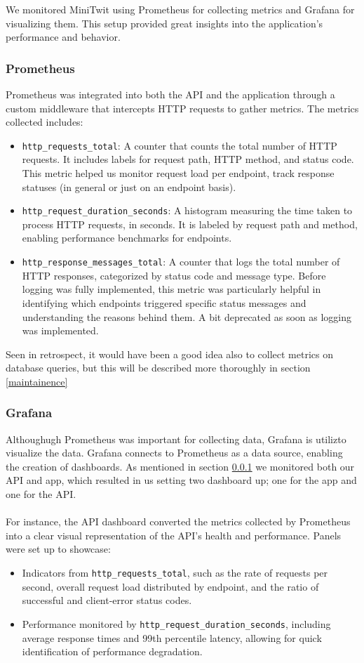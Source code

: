 We monitored MiniTwit using Prometheus for collecting metrics and Grafana for visualizing them. This setup provided great insights into the application's performance and behavior.

\subsubsection{Prometheus}\label{prom}
Prometheus was integrated into both the API and the application through a custom middleware that intercepts HTTP requests to gather metrics. The metrics collected includes:

\begin{itemize}
\item \texttt{http\_requests\_total}: A counter that counts the total number of HTTP requests. It includes labels for request path, HTTP method, and status code. This metric helped us monitor request load per endpoint, track response statuses (in general or just on an endpoint basis).
\item \texttt{http\_request\_duration\_seconds}: A histogram measuring the time taken to process HTTP requests, in seconds. It is labeled by request path and method, enabling performance benchmarks for endpoints.
\item \texttt{http\_response\_messages\_total}: A counter that logs the total number of HTTP responses, categorized by status code and message type. Before logging was fully implemented, this metric was particularly helpful in identifying which endpoints triggered specific status messages and understanding the reasons behind them. A bit deprecated as soon as logging was implemented.
\end{itemize}

Seen in retrospect, it would have been a good idea also to collect metrics on database queries, but this will be described more thoroughly in section \ref{maintainence}

\subsubsection{Grafana}
Althoughugh Prometheus was important for collecting data, Grafana is utilizto visualize the data. Grafana connects to Prometheus as a data source, enabling the creation of dashboards. As mentioned in section \ref{prom} we monitored both our API and app, which resulted in us setting two dashboard up; one for the app and one for the API.
\\\\
For instance, the API dashboard converted the metrics collected by Prometheus into a clear visual representation of the API's health and performance. Panels were set up to showcase:
\begin{itemize}
    \item Indicators from \texttt{http\_requests\_total}, such as the rate of requests per second, overall request load distributed by endpoint, and the ratio of successful and client-error status codes.
    \item Performance monitored by \texttt{http\_request\_duration\_seconds}, including average response times and 99th percentile latency, allowing for quick identification of performance degradation.
\end{itemize}